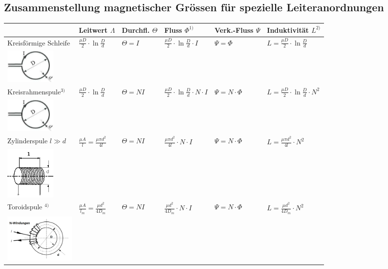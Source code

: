 \subsection{Zusammenstellung magnetischer Grössen für spezielle
Leiteranordnungen}
\begin{tabular}{|p{5cm}|l|l|l|l|l|}
  \hline
  & Leitwert $ \Lambda $ & Durchfl. $ \Theta $ & Fluss $ \Phi ^{1)} $ &
  Verk.-Fluss $ \Psi $ & Induktivität $L^{2)}$ \\
  \hline
  Kreisförmige Schleife & $\frac{\mu D}{2}\cdot\ln\frac{D}{d}$ & $\Theta = I$ & $\frac{\mu D}{2}\cdot\ln\frac{D}{d}\cdot I$ & $\Psi = \Phi$ & $L=\frac{\mu
  D}{2}\cdot\ln\frac{D}{d}$\\
  \includegraphics[width=2.5cm]{./images/kreisfoermige_schleife.png} & & & & & \\
  \hline
  Kreisrahmenspule$^{3)}$ & $\frac{\mu D}{2}\cdot\ln\frac{D}{d}$ & $\Theta = NI$ & $\frac{\mu D}{2}\cdot\ln\frac{D}{d}\cdot N \cdot I$ & $\Psi = N \cdot \Phi$ & $L=\frac{\mu  D}{2}\cdot\ln\frac{D}{d}\cdot N^2$\\
  \includegraphics[width=2.5cm]{./images/kreisrahmenspule.png} & & & & & \\
  \hline
  Zylinderspule $l \gg d$
  & $\frac{\mu A}{l} = \frac{\mu \pi d^2}{4l}$ & $\Theta = NI$ & $\frac{\mu \pi d^2}{4l} \cdot N \cdot I$ & $\Psi = N \cdot \Phi$ & $L=\frac{\mu \pi d^2}{4l}\cdot N^2$\\
  \includegraphics[width=2.5cm]{./images/zylinderspule.png} & & & & & \\
  \hline
  Toroidspule $^{4)}$ & $\frac{\mu A}{l_m} = \frac{\mu d^2}{4 D_m}$ & $\Theta = NI$ & $\frac{\mu d^2}{4 D_m}\cdot N \cdot I$ & $\Psi = N
  \cdot \Phi$ & $L=\frac{\mu d^2}{4 D_m}\cdot
  N^2$\\
  \includegraphics[width=3.5cm]{./images/toroidspule.png} & & & & & \\

\end{tabular}

